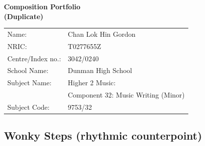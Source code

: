 \documentclass{article}
\begin{document}
\begin{center}
\vspace*{\fill}
\LARGE
    {\bf Composition Portfolio\\
    (Duplicate)}
\vspace*{\fill}
%
\end{center}
\begin{center}
    \large
\begin{tabular}{ll}
    Name: &Chan Lok Hin Gordon\\
    NRIC: &T0277655Z\\
    Centre/Index no.: &3042/0240\\
    School Name: &Dunman High School\\
    Subject Name: &Higher 2 Music:\\
    &Component 32: Music Writing (Minor)\\
    Subject Code: &9753/32
\end{tabular}
\end{center}

\newpage

\tableofcontents

\newpage

\begin{center}
\vspace*{\fill}
\LARGE
    \section{Wonky Steps (rhythmic counterpoint)}
\vspace*{\fill}
%
\end{center}

\newpage
\end{document}
